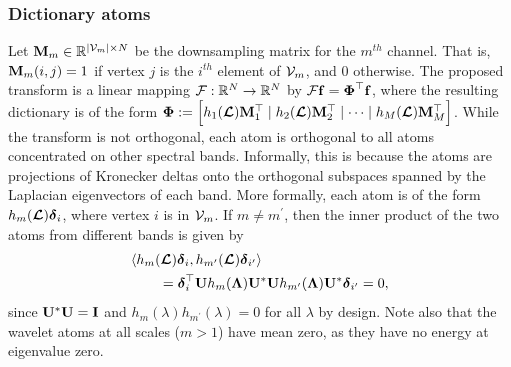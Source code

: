 \documentclass[journal, 10pt]{IEEEtran}
\begin{document}
\subsubsection{Dictionary atoms}
Let ${\bf M}_m \in \R^{|{\cal V}_m| \times N}$ be the downsampling matrix for the $m^{th}$ channel. That is, ${\bf M}_m(i,j)=1$ if vertex $j$ is the $i^{th}$ element of ${\cal V}_m$, and 0 otherwise. The proposed transform is a linear mapping ${\cal F}: \R^N \rightarrow \R^N$ by 
${\cal F}{\bf f} = \boldsymbol{\Phi}^{\top} {\bf f}$, where the %
resulting dictionary is of the form %
$\boldsymbol{\Phi}:=\Bigl[h_1(\boldsymbol{\mathcal{L}}){\bf M}_1^{\top} \mid 
h_2(\boldsymbol{\mathcal{L}}){\bf M}_2^{\top} \mid 
\cdots  
\mid 
h_M(\boldsymbol{\mathcal{L}}){\bf M}_M^{\top}
\Bigr]$.
%
%
While the transform is not orthogonal, each atom is orthogonal to all atoms concentrated on other spectral bands. Informally, this is because the atoms are projections of Kronecker deltas onto the orthogonal subspaces spanned by the Laplacian eigenvectors of each band. More formally, each atom is of the form $h_m(\boldsymbol{\mathcal{L}}){\boldsymbol \delta}_i$, where vertex $i$ is in ${\cal V}_m$. If $m \neq m^{\prime}$, then the inner product of the two atoms from different bands is given by
\begin{align} \label{Eq:ortho_bands}
&\langle h_m(\L){\boldsymbol \delta}_i , h_{m^{\prime}}(\L){\boldsymbol \delta}_{i^{\prime}} \rangle \nonumber \\
&~~~~~~= {\boldsymbol \delta}_i^{\top} {\bf U} h_m({\boldsymbol \Lambda}) {\bf U}^* {\bf U} h_{m^{\prime}}({\boldsymbol \Lambda}) {\bf U}^* {\boldsymbol \delta}_{i^{\prime}}= 0,
\end{align}
since ${\bf U}^* {\bf U}={\bf I}$ and $h_m(\lambda)h_{m^{\prime}}(\lambda)=0$ for all $\lambda$ by design.
Note also that the wavelet atoms at all scales ($m>1$) have mean zero, as they have no energy at eigenvalue zero.
\end{document}
